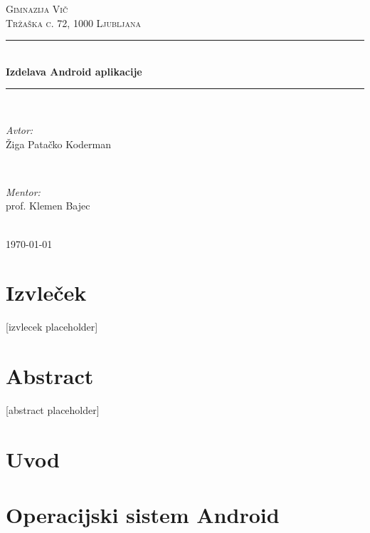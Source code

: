 \documentclass[a4paper, 12pt]{article}
\begin{document}
\begin{titlepage}
	\newcommand{\HRule}{\rule{\linewidth}{0.5mm}}
	\center

	\textsc{\LARGE Gimnazija Vič}\\[0.5cm]
	\textsc{\Large Tržaška c. 72, 1000 Ljubljana}\\[1.5cm]

	\HRule \\[0.4cm]
	{ \huge \bfseries Izdelava Android aplikacije}\\[0.4cm]
	\HRule \\[1.5cm]

	\begin{minipage}{0.4\textwidth}
		\begin{flushleft} \large
			\emph{Avtor:}\\
			Žiga Patačko Koderman
		\end{flushleft}
	\end{minipage}
	~
	\begin{minipage}{0.4\textwidth}
		\begin{flushright} \large
			\emph{Mentor:} \\
			prof. Klemen Bajec
		\end{flushright}
		\end{minipage}\\[4cm]

		{\large \today}\\[3cm]

		\vfill
	\end{titlepage}

	\section*{Izvleček}
	[izvlecek placeholder]

	\section*{Abstract}
	[abstract placeholder]

	\pagebreak

	\tableofcontents
	\pagebreak

	\section{Uvod}
	

	\section{Operacijski sistem Android}
	
\end{document}
